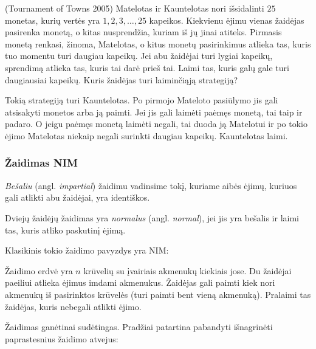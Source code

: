 \begin{pavnr}{(Tournament of Towns 2005)}
  Matelotas ir Kauntelotas nori išsidalinti $25$ monetas, kurių vertės yra $1, 2, 3, \dots
  , 25$ kapeikos. Kiekvienu ėjimu vienas žaidėjas pasirenka monetą, o kitas
  nusprendžia, kuriam iš jų jinai atiteks. Pirmasis monetą renkasi, žinoma,
  Matelotas, o kitus monetų pasirinkimus atlieka tas, kuris tuo momentu turi
  daugiau kapeikų. Jei abu žaidėjai turi lygiai kapeikų, sprendimą atlieka
  tas, kuris tai darė prieš tai. Laimi tas, kuris galų gale turi
  daugiausiai kapeikų.  Kuris žaidėjas turi laiminčiąją strategiją?
\end{pavnr}

Tokią strategiją turi Kauntelotas. Po pirmojo Mateloto pasiūlymo jis gali atsisakyti
monetos arba ją paimti. Jei jis gali laimėti paėmęs monetą, tai taip ir
padaro. O jeigu paėmęs monetą laimėti negali, tai duoda ją Matelotui ir po
tokio ėjimo Matelotas niekaip negali surinkti daugiau kapeikų. Kauntelotas laimi.

\subsubsection{Žaidimas NIM}

\begin{api}
  \emph{Bešaliu} (angl. \emph{impartial}) žaidimu vadinsime tokį, kuriame aibės ėjimų, kuriuos
  gali atlikti abu žaidėjai, yra identiškos.
\end{api}

\begin{api}
  Dviejų žaidėjų žaidimas yra \emph{normalus} (angl. \emph{normal}), jei jis yra bešalis ir laimi
  tas, kuris atliko paskutinį ėjimą.
\end{api}

Klasikinis tokio žaidimo pavyzdys yra NIM:

\begin{api}
  Žaidimo erdvė yra $n$ krūvelių su įvairiais akmenukų kiekiais jose. Du
  žaidėjai paeiliui atlieka ėjimus imdami akmenukus. Žaidėjas gali paimti
  kiek nori akmenukų iš pasirinktos krūvelės (turi paimti bent vieną
  akmenuką). Pralaimi tas žaidėjas, kuris nebegali atlikti ėjimo.
\end{api}

Žaidimas ganėtinai sudėtingas. Pradžiai patartina pabandyti išnagrinėti
paprastesnius žaidimo atvejus:


